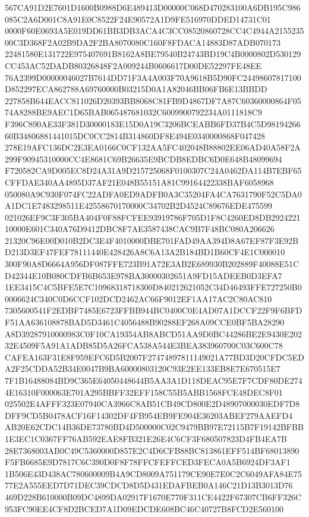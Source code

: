 \documentclass[UTF8,fontset=fandol,zihao=-4,a4paper]{ctexart}
\begin{document}
{{567CA91D2E7601D1600B0988D6E489413D00000C068D470283100A6DB195C986085C2A6D001C8A91E0C8522F24E90572A1D9FE516970DDED14731C01
0000F60E0693A5E019DD61BB3DB3ACA4C3CC08520860728CC4C4944A215523500C3D368F2A02B9DA2F2BA8070080C160F8FDACA14883D87ADB070173
22481580E131722E975407691B8162A8BE79540B24743BD19C4B0000802D530129CC453AC52DADB80326848F2A009244B0606617D00DE52297FE48EE
76A2399D00000046027B7614DD71F3A4A003F70A9618B5D90FC24498607817100D852297ECA862788A69760000B03215D0A1A82046BB06FB6E13BBDD
227858B644EACC811026D20393BB8068C81FB9D4867DF7A87C60360000864F0574A8288BE9AEC1D65BAB065487681032C6009900792234A0111818C9
F396C890AE33F381D30000183E15D0A19C3206BCEABB6FD37B4C5D9819426660B34806881441015DC0CC2814B314860DF8E494E0340000868F047428
278E19AFC136DC2E3EA0166C0CF132AA5FC402048B88802EE06AD40A58F2A299F90945310000CC4E8681C69B26635E9BCDB8EDBC6D0E648B48099694
F720582CA9D005EC8D24A31A9D215725068F0100307C24A0462DA114B7EBF65CFFDAE340AA4895D37AF21E048B55151A81C99164422338BAF6058968
050080A9C930F074FC22ADFA0ED9ADFB0A3C35204FA4CA7631790F52C5DA0A1DC1E7483298511E42558670170000C34702B2D4524C89676EDE475599
021026EF9C3F305BA404F0F88FCFEE93919786F705D1F8C4260ED8DB292422110000E601C340A76D9412DBC8F7AE3587438CAC9B7F48BC080A206626
21320C96E00D010B2DC3E4F4010000DBE701FAD49AA394D8A67EF87F3E92BD213D3EF47FEF78111440E428426A8C6A13A2B184BD1B60CF4E1C000010
300F90A8D6664A956DF087FFE723B91A72E3AB2E689930B202889F40088E51CD42344E10B080CDFB6B653E978BA30000302651A9FD15ADEEB0D3EFA7
1EE3415C4C5BFE5E7C10968318718300D840212621052C34D46493FFE727250B00006624C340C0D6CCF102DCD2462AC66F9012EF1AA17AC2C80AC810
7305600541F2EDBF7485E6723FFBB944BC0400C0E4AD07A1DCCF22F9F6BFDF51AA636108878BAD5D3461C4056488B90288EF268A09CCE0BF5BA28290
A8D39287910000983C0F10CA19354AB8ABCD51AA9D0BC44286BE2E9430E20232E4509F5A91A1ADB85D5A26FCA538A544E3BEA383960700C03C600C78
CAFEA163F31E8F959EFC6D5B2007F27474897811149021A77BD3D20CFDC5EDA2F25CDDA52B34E0047B9BA60000803120C93E2EE133EB8E7E670515E7
7F1B16488084BD9C365E64050448644B5AA3A1D118DEAC95E7F7CDF80DE2744E16310F000063E701A295BBFF32EFF158C55B5ABB1568FCE48DEC8F01
025502E4AFFF323E07940CA3966C8AB51CB49CD800E2D48907000030EDF7D8DFF9CD5B0478ACF16F14302DF4FB954EB9FE904E36203ABEF279AAEFD4
AB20E62CDC14B36DE73780BD4D500000C02C9479BB97E72115B7F19142BFBB1E3EC1C0367FF76AB592EAE8FB321E26E4C6CF3F680507823D4FB4EA7B
28E7368003AB0C49C5360000D857E2C4D6CFB88BC813861EFF514BF68013890F5FB6685E9D7817C6C390D0F8F78FFCFEFFCED3FECA0A5B6924DF3AF1
1B506E43D438AC780600009B4A9CD8009A751179CE90E7E0C2C6049AFA84E7577E2A555EED7D71DEC39CDCD8D5D431EDAFBEB0A146C21D13B3013D76
469D228B610000B09DC4899DA02917F1670E770F311CE4422F67307CB6FF326C953FC90EE4CF8D2BCED7A1D09EDCDE608BC46C40727B8FCD2E560100
}}
\end{document}
